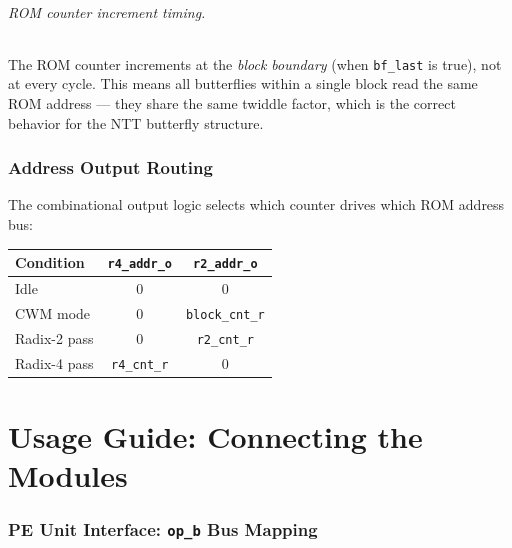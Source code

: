 \documentclass[11pt,a4paper]{article}
\newcommand{\sv}[1]{\texttt{#1}}
\newcommand{\port}[1]{\texttt{#1}}
\begin{document}
\paragraph{ROM counter increment timing.}
The ROM counter increments at the \emph{block boundary} (when \sv{bf\_last} is true), not at every cycle. This means all butterflies within a single block read the same ROM address --- they share the same twiddle factor, which is the correct behavior for the NTT butterfly structure.

\section{Address Output Routing}
\label{sec:addr-routing}

The combinational output logic selects which counter drives which ROM address bus:

\begin{center}
\renewcommand{\arraystretch}{1.3}
\begin{tabular}{l|cc}
  \toprule
  \textbf{Condition} & \port{r4\_addr\_o} & \port{r2\_addr\_o} \\
  \midrule
  Idle                  & 0          & 0                  \\
  CWM mode              & 0          & \sv{block\_cnt\_r} \\
  Radix-2 pass          & 0          & \sv{r2\_cnt\_r}    \\
  Radix-4 pass          & \sv{r4\_cnt\_r} & 0             \\
  \bottomrule
\end{tabular}
\end{center}

\part{Usage Guide: Connecting the Modules}

\section{PE Unit Interface: \port{op\_b} Bus Mapping}
\label{sec:pe-unit-mapping}
\end{document}
